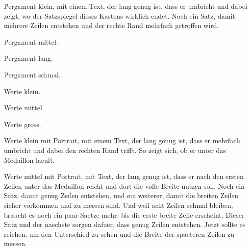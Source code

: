 \documentclass[raster,ohnehintergrund]{dsa5latex}
\begin{document}
\begin{dsaPergamentKlein}
Pergament klein, mit einem Text, der lang genug ist, dass er umbricht und dabei zeigt, wo der Satzspiegel dieses Kastens wirklich endet. Noch ein Satz, damit mehrere Zeilen entstehen und der rechte Rand mehrfach getroffen wird.
\end{dsaPergamentKlein}
\clearpage

\begin{dsaPergamentMittel}
Pergament mittel.
\end{dsaPergamentMittel}
\clearpage

\begin{dsaPergamentLang}
Pergament lang.
\end{dsaPergamentLang}
\clearpage

\begin{dsaPergamentSchmal}
Pergament schmal.
\end{dsaPergamentSchmal}
\clearpage

\begin{dsaWerteKlein}
Werte klein.
\end{dsaWerteKlein}
\clearpage

\begin{dsaWerteMittel}
Werte mittel.
\end{dsaWerteMittel}
\clearpage

\begin{dsaWerteGross}
Werte gross.
\end{dsaWerteGross}
\clearpage

\begin{dsaWerteKleinPortrait}[dsaportrait=grafiken/portraitrahmen]
Werte klein mit Portrait, mit einem Text, der lang genug ist, dass er
mehrfach umbricht und dabei den rechten Rand trifft. So zeigt sich, ob er
unter das Medaillon laeuft.
\end{dsaWerteKleinPortrait}
\clearpage

\begin{dsaWerteMittelPortrait}[dsaportrait=grafiken/portraitrahmen]
\dsaPortraitfluss
Werte mittel mit Portrait, mit Text, der lang genug ist, dass er nach den
ersten Zeilen unter das Medaillon reicht und dort die volle Breite nutzen
soll. Noch ein Satz, damit genug Zeilen entstehen, und ein weiterer, damit
die breiten Zeilen sicher vorkommen und zu messen sind. Und weil acht
Zeilen schmal bleiben, braucht es noch ein paar Saetze mehr, bis die erste
breite Zeile erscheint. Dieser Satz und der naechste sorgen dafuer, dass
genug Zeilen entstehen. Jetzt sollte es reichen, um den Unterschied zu
sehen und die Breite der spaeteren Zeilen zu messen.
\end{dsaWerteMittelPortrait}
\clearpage
\end{document}
